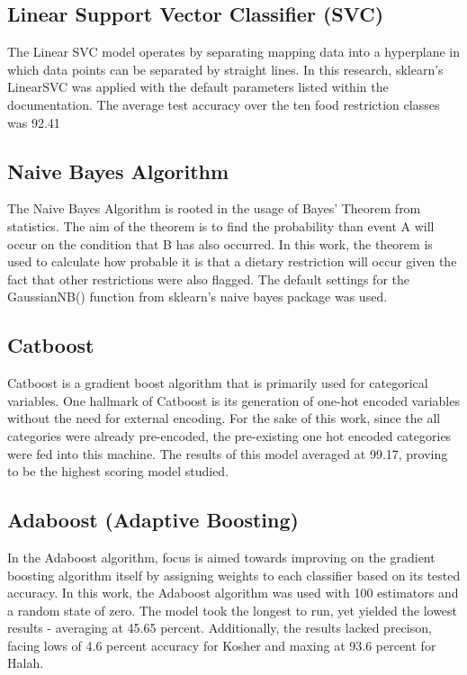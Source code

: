 \documentclass[twocolumn]{article}
\begin{document}
\subsection{Linear Support Vector Classifier (SVC)}
The Linear SVC model operates by separating mapping data into a hyperplane in which data points can be separated by straight lines. In this research, sklearn's LinearSVC was applied with the default parameters listed within the documentation. The average test accuracy over the ten food restriction classes was 92.41%
\subsection{Naive Bayes Algorithm}
The Naive Bayes Algorithm is rooted in the usage of Bayes' Theorem from statistics. The aim of the theorem is to find the probability than event A will occur on the condition that B has also occurred. In this work, the theorem is used to calculate how probable it is that a dietary restriction will occur given the fact that other restrictions were also flagged. The default settings for the GaussianNB() function from sklearn's naive bayes package was used.
\subsection{Catboost}
Catboost is a gradient boost algorithm that is primarily used for categorical variables. One hallmark of Catboost is its generation of one-hot encoded variables without the need for external encoding. For the sake of this work, since the all categories were already pre-encoded, the pre-existing one hot encoded categories were fed into this machine. The results of this model averaged at 99.17, proving to be the highest scoring model studied. 
\subsection{Adaboost (Adaptive Boosting)}
In the Adaboost algorithm, focus is aimed towards improving on the gradient boosting algorithm itself by assigning weights to each classifier based on its tested accuracy. In this work, the Adaboost algorithm was used with 100 estimators and a random state of zero. The model took the longest to run, yet yielded the lowest results - averaging at 45.65 percent. Additionally, the results lacked precison, facing lows of 4.6 percent accuracy for Kosher and maxing at 93.6 percent for Halah. 
\end{document}
